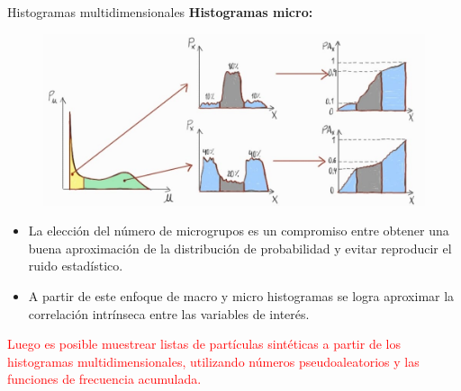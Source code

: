 \documentclass[aspectratio=169,english]{beamer}
\begin{document}
\begin{frame}[fragile]{Histogramas multidimensionales}
    \textbf{Histogramas micro:}

    \begin{figure}
        \centering
        \includegraphics[width=0.55\linewidth]{imagens/esquema4.jpeg}
        \label{fig:esquema4}
    \end{figure}

    \begin{itemize}
        \item La elección del número de microgrupos es un compromiso entre obtener una buena aproximación de la distribución de probabilidad y evitar reproducir el ruido estadístico.
        \item A partir de este enfoque de macro y micro histogramas se logra aproximar la correlación intrínseca entre las variables de interés.
    \end{itemize}


    \textcolor{red}{Luego es posible muestrear listas de partículas sintéticas a partir de los histogramas multidimensionales, utilizando números pseudoaleatorios y las funciones de frecuencia acumulada.}

     

\end{frame}
\end{document}
